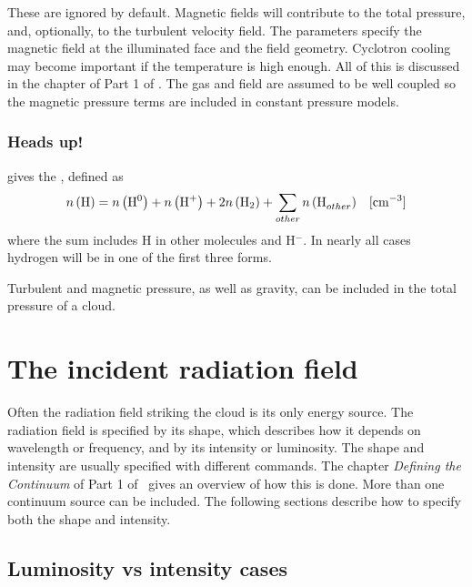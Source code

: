 \documentclass[12pt,twoside]{article}
\begin{document}
\quad These are ignored
\label{command:MagneticField}
by default.  Magnetic fields will
contribute to the total pressure, and, optionally, to the turbulent velocity
field.  The parameters specify the magnetic field at the illuminated face
and the field geometry.
Cyclotron cooling may become important if the
temperature is high enough.
All of this is discussed in the chapter
 of Part 1 of \Hazy.
The gas and field are assumed to be well
coupled so the magnetic pressure terms are included in constant pressure
models.

\subsubsection{Heads up!}
 gives the , defined as
\begin{equation}
n\left( {\rm{H}} \right) = n\left( {{\rm{H}}^{\rm{0}} } \right) + n\left(
{{\rm{H}}^ +  } \right) + 2n\left( {{\rm{H}}_2 } \right) +
\sum\limits_{other} {n\left( {{\rm{H}}_{other}^{} } \right)}
\quad \rm{[cm^{-3}]}
\end{equation}
where the sum includes H in other molecules and H$^-$.  In nearly all cases
hydrogen will be in one of the first three forms.

Turbulent and magnetic pressure, as well as gravity, can be included in the total pressure
of a  cloud.

\section{The incident radiation field}
\label{sec:IncidentRadiationField}

Often the radiation field striking the cloud is its only energy source.
The radiation field is specified by its shape, which describes how it depends
on wavelength or frequency, and by its intensity or luminosity.  The shape
and intensity are usually specified with different commands.
The chapter
\emph{Defining the Continuum} of Part 1 of
\Hazy\ gives an overview of how this is
done.  More than one continuum source can be included.  The following
sections describe how to specify both the shape and intensity.

\subsection{Luminosity vs intensity cases}
\label{sec:LuminosityVsIntensityCases}
\end{document}
